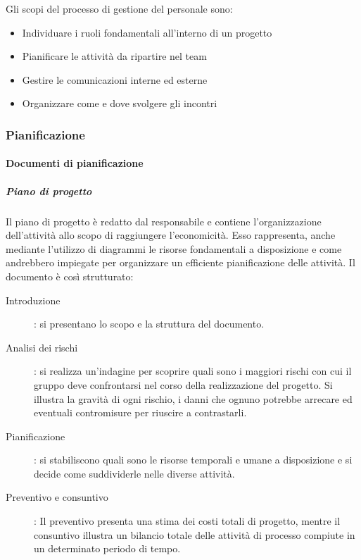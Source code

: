 \documentclass[../norme-di-progetto.tex]{subfiles}
\begin{document}
Gli scopi del processo di gestione del personale sono:

\begin{itemize}
  \item Individuare i ruoli fondamentali all'interno di un progetto
  \item Pianificare le attività da ripartire nel team
  \item Gestire le comunicazioni interne ed esterne
  \item Organizzare come e dove svolgere gli incontri
\end{itemize}

\subsubsection{Pianificazione}%
\label{subs:pianificazione}

\paragraph{Documenti di pianificazione}%
\label{par:documenti_di_pianificazione}

\subparagraph{Piano di progetto}%
\label{subp:piano_di_progetto}
Il piano di progetto è redatto dal responsabile e contiene l'organizzazione dell'attività allo scopo di raggiungere l'economicità. Esso rappresenta, anche mediante l'utilizzo di diagrammi le risorse fondamentali a disposizione e come andrebbero impiegate per organizzare un efficiente pianificazione delle attività. Il documento è così strutturato:
\begin{description}
  \item [Introduzione]: si presentano lo scopo e la struttura del documento.
  \item [Analisi dei rischi]: si realizza un'indagine per scoprire quali sono i maggiori rischi con cui il gruppo deve confrontarsi nel corso della realizzazione del progetto. Si illustra la gravità di ogni rischio, i danni che ognuno potrebbe arrecare ed eventuali contromisure per riuscire a contrastarli.
  \item [Pianificazione]: si stabiliscono quali sono le risorse temporali e umane a disposizione e si decide come suddividerle nelle diverse attività.
  \item [Preventivo e consuntivo]: Il preventivo presenta una stima dei costi totali di progetto, mentre il consuntivo illustra un bilancio totale delle attività di processo compiute in un determinato periodo di tempo.
\end{description}
\end{document}
